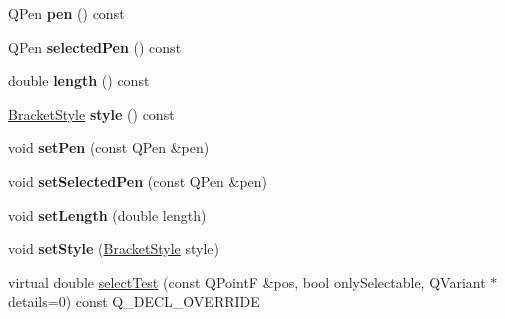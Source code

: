 \begin{DoxyCompactItemize}
\item 
Q\+Pen {\bfseries pen} () const \hypertarget{class_q_c_p_item_bracket_a8963ff4a232b649c83d2461fd3c30d39}{}\label{class_q_c_p_item_bracket_a8963ff4a232b649c83d2461fd3c30d39}

\item 
Q\+Pen {\bfseries selected\+Pen} () const \hypertarget{class_q_c_p_item_bracket_a9f6ea5ea9559ef36dfacdadd6e9bdcf0}{}\label{class_q_c_p_item_bracket_a9f6ea5ea9559ef36dfacdadd6e9bdcf0}

\item 
double {\bfseries length} () const \hypertarget{class_q_c_p_item_bracket_aed5126eafcb1381ee5718499c20ba023}{}\label{class_q_c_p_item_bracket_aed5126eafcb1381ee5718499c20ba023}

\item 
\hyperlink{class_q_c_p_item_bracket_a7ac3afd0b24a607054e7212047d59dbd}{Bracket\+Style} {\bfseries style} () const \hypertarget{class_q_c_p_item_bracket_afad726f453f70fe77c0e9c2f260fff97}{}\label{class_q_c_p_item_bracket_afad726f453f70fe77c0e9c2f260fff97}

\item 
void {\bfseries set\+Pen} (const Q\+Pen \&pen)\hypertarget{class_q_c_p_item_bracket_ab13001d9cc5d8f9e56ea15bdda682acb}{}\label{class_q_c_p_item_bracket_ab13001d9cc5d8f9e56ea15bdda682acb}

\item 
void {\bfseries set\+Selected\+Pen} (const Q\+Pen \&pen)\hypertarget{class_q_c_p_item_bracket_a349785c31122778a520c64891fa204c5}{}\label{class_q_c_p_item_bracket_a349785c31122778a520c64891fa204c5}

\item 
void {\bfseries set\+Length} (double length)\hypertarget{class_q_c_p_item_bracket_ac7cfc3da7da9b5c5ac5dfbe4f0351b2a}{}\label{class_q_c_p_item_bracket_ac7cfc3da7da9b5c5ac5dfbe4f0351b2a}

\item 
void {\bfseries set\+Style} (\hyperlink{class_q_c_p_item_bracket_a7ac3afd0b24a607054e7212047d59dbd}{Bracket\+Style} style)\hypertarget{class_q_c_p_item_bracket_a612dffa2373422eef8754d690add3703}{}\label{class_q_c_p_item_bracket_a612dffa2373422eef8754d690add3703}

\item 
virtual double \hyperlink{class_q_c_p_item_bracket_ae0e06156ec6a11c8a0c4b6f8883c72a8}{select\+Test} (const Q\+PointF \&pos, bool only\+Selectable, Q\+Variant $\ast$details=0) const Q\+\_\+\+D\+E\+C\+L\+\_\+\+O\+V\+E\+R\+R\+I\+DE
\end{DoxyCompactItemize}
